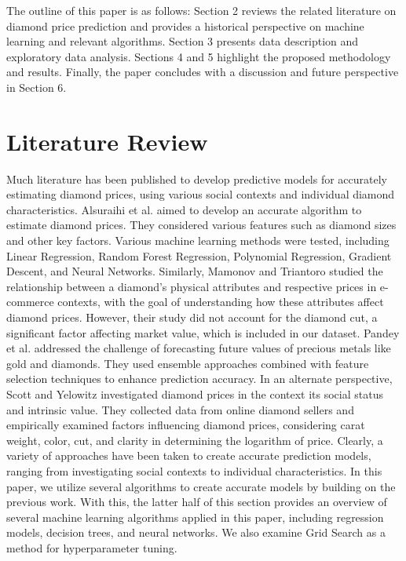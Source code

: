 \documentclass[conference]{IEEEtran}
\begin{document}
The outline of this paper is as follows: Section 2 reviews the related literature on diamond price prediction and provides a historical perspective on machine learning and relevant algorithms. Section 3 presents data description and exploratory data analysis. Sections 4 and 5 highlight the proposed methodology and results. Finally, the paper concludes with a discussion and future perspective in Section 6.

\section{Literature Review}

Much literature has been published to develop predictive models for accurately estimating diamond prices, using various social contexts and individual diamond characteristics. Alsuraihi et al. \cite{Alsuraihi} aimed to develop an accurate algorithm to estimate diamond prices. They considered various features such as diamond sizes and other key factors. Various machine learning methods were tested, including Linear Regression, Random Forest Regression, Polynomial Regression, Gradient Descent, and Neural Networks. Similarly, Mamonov and Triantoro \cite{Mamonov} studied the relationship between a diamond's physical attributes and respective prices in e-commerce contexts, with the goal of understanding how these attributes affect diamond prices. However, their study did not account for the diamond cut, a significant factor affecting market value, which is included in our dataset. Pandey et al. \cite{Pandey} addressed the challenge of forecasting future values of precious metals like gold and diamonds. They used ensemble approaches combined with feature selection techniques to enhance prediction accuracy. In an alternate perspective, Scott and Yelowitz \cite{Scott} investigated diamond prices in the context its social status and intrinsic value. They collected data from online diamond sellers and empirically examined factors influencing diamond prices, considering carat weight, color, cut, and clarity in determining the logarithm of price. Clearly, a variety of approaches have been taken to create accurate prediction models, ranging from investigating social contexts to individual characteristics. In this paper, we utilize several algorithms to create accurate models by building on the previous work. With this, the latter half of this section provides an overview of several machine learning algorithms applied in this paper, including regression models, decision trees, and neural networks. We also examine Grid Search as a method for hyperparameter tuning.
\end{document}
